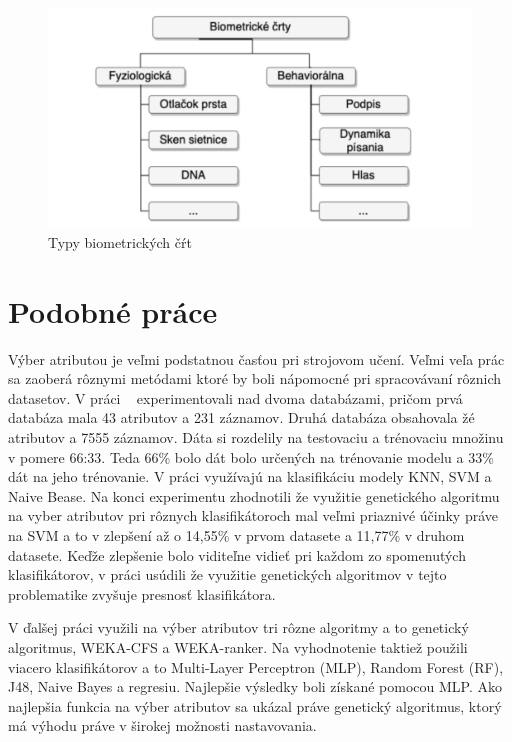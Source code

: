 \documentclass[runningheads]{llncs}
\begin{document}
\begin{figure}
\includegraphics[width=\textwidth]{image/rozdelenie_biometrie.png}
\caption{Typy biometrických čŕt~\cite{ref_teh}} \label{fig_rozdelenie_biometrie}
\end{figure}

\section{Podobné práce}

Výber atributou je veľmi podstatnou časťou pri strojovom učení. Veľmi veľa prác sa 
zaoberá rôznymi metódami ktoré by boli nápomocné pri spracovávaní rôznich datasetov.
V práci ~\cite{ref_nascimento} experimentovali nad dvoma databázami, pričom 
prvá databáza mala 43 atributov a 231 záznamov. Druhá databáza obsahovala žé atributov 
a 7555 záznamov. Dáta si rozdelily na testovaciu a trénovaciu množinu v pomere 66:33. 
Teda 66\% bolo dát bolo určených na trénovanie modelu a 33\% dát na jeho trénovanie. 
V práci využívajú na klasifikáciu modely KNN, SVM a Naive Bease. Na konci experimentu zhodnotili 
že využitie genetického algoritmu na vyber atributov pri rôznych klasifikátoroch mal veľmi priaznivé
účinky práve na SVM a to v zlepšení až o 14,55\% v prvom datasete a 11,77\% v druhom datasete.
Keďže zlepšenie bolo viditeľne vidieť pri každom zo spomenutých klasifikátorov, v práci usúdili že
využitie genetických algoritmov v tejto problematike zvyšuje presnosť klasifikátora.

V ďalšej práci\cite{ref_babatunde} využili na výber atributov tri rôzne algoritmy a to 
genetický algoritmus, WEKA-CFS a WEKA-ranker. Na vyhodnotenie taktiež použili viacero klasifikátorov
a to Multi-Layer Perceptron (MLP), Random Forest (RF), J48, Naive Bayes a regresiu. Najlepšie výsledky 
boli získané pomocou MLP. Ako najlepšia funkcia na výber atributov sa ukázal práve genetický algoritmus,
ktorý má výhodu práve v širokej možnosti nastavovania.
\end{document}
